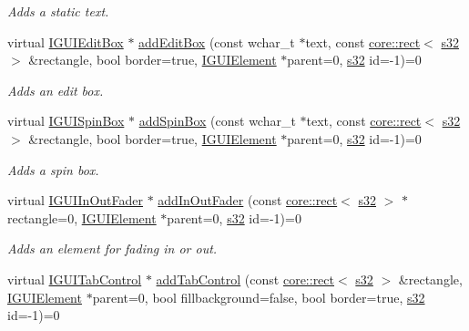 \begin{DoxyCompactItemize}
\begin{DoxyCompactList}\small\item\em Adds a static text. \end{DoxyCompactList}\item 
virtual \hyperlink{classirr_1_1gui_1_1IGUIEditBox}{I\+G\+U\+I\+Edit\+Box} $\ast$ \hyperlink{classirr_1_1gui_1_1IGUIEnvironment_ab46cdfa5f746932166ac4ccfa86a70eb}{add\+Edit\+Box} (const wchar\+\_\+t $\ast$text, const \hyperlink{classirr_1_1core_1_1rect}{core\+::rect}$<$ \hyperlink{namespaceirr_ac66849b7a6ed16e30ebede579f9b47c6}{s32} $>$ \&rectangle, bool border=true, \hyperlink{classirr_1_1gui_1_1IGUIElement}{I\+G\+U\+I\+Element} $\ast$parent=0, \hyperlink{namespaceirr_ac66849b7a6ed16e30ebede579f9b47c6}{s32} id=-\/1)=0
\begin{DoxyCompactList}\small\item\em Adds an edit box. \end{DoxyCompactList}\item 
virtual \hyperlink{classirr_1_1gui_1_1IGUISpinBox}{I\+G\+U\+I\+Spin\+Box} $\ast$ \hyperlink{classirr_1_1gui_1_1IGUIEnvironment_ab7deca80cf9b0422fba30985612c3c99}{add\+Spin\+Box} (const wchar\+\_\+t $\ast$text, const \hyperlink{classirr_1_1core_1_1rect}{core\+::rect}$<$ \hyperlink{namespaceirr_ac66849b7a6ed16e30ebede579f9b47c6}{s32} $>$ \&rectangle, bool border=true, \hyperlink{classirr_1_1gui_1_1IGUIElement}{I\+G\+U\+I\+Element} $\ast$parent=0, \hyperlink{namespaceirr_ac66849b7a6ed16e30ebede579f9b47c6}{s32} id=-\/1)=0
\begin{DoxyCompactList}\small\item\em Adds a spin box. \end{DoxyCompactList}\item 
virtual \hyperlink{classirr_1_1gui_1_1IGUIInOutFader}{I\+G\+U\+I\+In\+Out\+Fader} $\ast$ \hyperlink{classirr_1_1gui_1_1IGUIEnvironment_a9ffbddbf3785b54a284d83df4ce3df02}{add\+In\+Out\+Fader} (const \hyperlink{classirr_1_1core_1_1rect}{core\+::rect}$<$ \hyperlink{namespaceirr_ac66849b7a6ed16e30ebede579f9b47c6}{s32} $>$ $\ast$rectangle=0, \hyperlink{classirr_1_1gui_1_1IGUIElement}{I\+G\+U\+I\+Element} $\ast$parent=0, \hyperlink{namespaceirr_ac66849b7a6ed16e30ebede579f9b47c6}{s32} id=-\/1)=0
\begin{DoxyCompactList}\small\item\em Adds an element for fading in or out. \end{DoxyCompactList}\item 
virtual \hyperlink{classirr_1_1gui_1_1IGUITabControl}{I\+G\+U\+I\+Tab\+Control} $\ast$ \hyperlink{classirr_1_1gui_1_1IGUIEnvironment_af076e5646db2e392309aef75edd28238}{add\+Tab\+Control} (const \hyperlink{classirr_1_1core_1_1rect}{core\+::rect}$<$ \hyperlink{namespaceirr_ac66849b7a6ed16e30ebede579f9b47c6}{s32} $>$ \&rectangle, \hyperlink{classirr_1_1gui_1_1IGUIElement}{I\+G\+U\+I\+Element} $\ast$parent=0, bool fillbackground=false, bool border=true, \hyperlink{namespaceirr_ac66849b7a6ed16e30ebede579f9b47c6}{s32} id=-\/1)=0

\end{DoxyCompactItemize}
